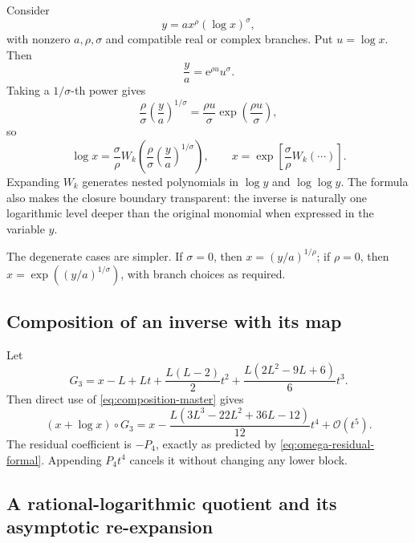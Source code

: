 \documentclass[11pt]{article}
\theoremstyle{pltheorem}
\newcommand{\e}{\mathrm e}
\newcommand{\bigO}{\mathcal O}
\newcommand{\compose}{\mathbin{\circ}}
\begin{document}
Consider
\begin{equation}\label{eq:powerlog-inversion}
 y=a x^\rho(\log x)^\sigma,
\end{equation}
with nonzero \(a,\rho,\sigma\) and compatible real or complex branches.  Put \(u=\log x\).  Then
\[
 \frac ya=\e^{\rho u}u^\sigma.
\]
Taking a \(1/\sigma\)-th power gives
\[
 \frac{\rho}{\sigma}\left(\frac ya\right)^{1/\sigma}
 =\frac{\rho u}{\sigma}\exp\left(\frac{\rho u}{\sigma}\right),
\]
so
\begin{equation}\label{eq:powerlog-inverse-exact}
 \boxed{\quad
 \log x=\frac{\sigma}{\rho}
 W_k\!\left(\frac{\rho}{\sigma}
 \left(\frac ya\right)^{1/\sigma}\right),
 \qquad
 x=\exp\!\left[\frac{\sigma}{\rho}W_k(\cdots)\right].
 \quad}
\end{equation}
Expanding \(W_k\) generates nested polynomials in \(\log y\) and \(\log\log y\).  The formula also makes the closure boundary transparent: the inverse is naturally one logarithmic level deeper than the original monomial when expressed in the variable \(y\).

The degenerate cases are simpler.  If \(\sigma=0\), then
\(x=(y/a)^{1/\rho}\); if \(\rho=0\), then
\(x=\exp((y/a)^{1/\sigma})\), with branch choices as required.

\subsection{Composition of an inverse with its map}

Let
\begin{equation}\label{eq:omega3}
 G_3=x-L+Lt+\frac{L(L-2)}2t^2
 +\frac{L(2L^2-9L+6)}6t^3.
\end{equation}
Then direct use of \cref{eq:composition-master} gives
\begin{equation}\label{eq:omega3-residual}
 (x+\log x)\compose G_3
 =x-\frac{L(3L^3-22L^2+36L-12)}{12}t^4
 +\bigO(t^5).
\end{equation}
The residual coefficient is \(-P_4\), exactly as predicted by
\cref{eq:omega-residual-formal}.  Appending \(P_4t^4\) cancels it without changing any lower block.

\subsection{A rational-logarithmic quotient and its asymptotic re-expansion}
\end{document}
